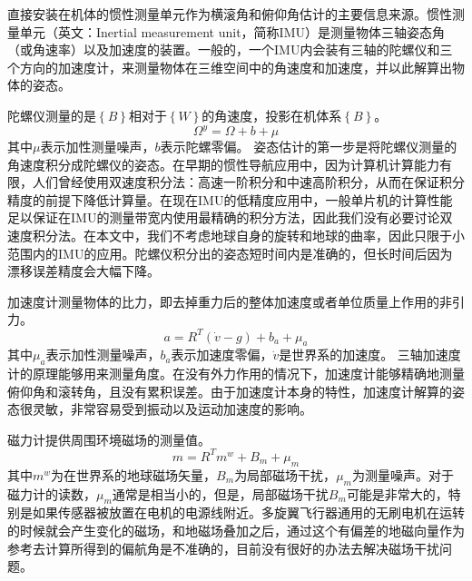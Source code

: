 \documentclass[
  type=master
]{gdutthesis}
\begin{document}
直接安装在机体的惯性测量单元作为横滚角和俯仰角估计的主要信息来源。惯性测量单元（英文：Inertial measurement unit，简称IMU）是测量物体三轴姿态角（或角速率）以及加速度的装置。一般的，一个IMU内会装有三轴的陀螺仪和三个方向的加速度计，来测量物体在三维空间中的角速度和加速度，并以此解算出物体的姿态。\par
陀螺仪测量的是$\left\{ B \right\}$相对于$\left\{ W \right\}$的角速度，投影在机体系$\left\{ B \right\}$。
\begin{equation}\label{eq:gyromodel}
	\Omega^y=\Omega+b+\mu
\end{equation}
其中$\mu$表示加性测量噪声，$b$表示陀螺零偏。
姿态估计的第一步是将陀螺仪测量的角速度积分成陀螺仪的姿态。在早期的惯性导航应用中，因为计算机计算能力有限，人们曾经使用双速度积分法：高速一阶积分和中速高阶积分，从而在保证积分精度的前提下降低计算量\cite{savage1998strapdown}。在现在IMU的低精度应用中，一般单片机的计算性能足以保证在IMU的测量带宽内使用最精确的积分方法，因此我们没有必要讨论双速度积分法。在本文中，我们不考虑地球自身的旋转和地球的曲率，因此只限于小范围内的IMU的应用。陀螺仪积分出的姿态短时间内是准确的，但长时间后因为漂移误差精度会大幅下降\cite{钱华明2010基于}。\par
加速度计测量物体的比力，即去掉重力后的整体加速度或者单位质量上作用的非引力。
\begin{equation}\label{eq:accmodel}
	a=R^T(\dot{v}-g)+b_a+\mu_a
\end{equation}
其中$\mu_a$表示加性测量噪声，$b_a$表示加速度零偏，$\dot{v}$是世界系的加速度。
三轴加速度计的原理能够用来测量角度。在没有外力作用的情况下，加速度计能够精确地测量俯仰角和滚转角，且没有累积误差。由于加速度计本身的特性，加速度计解算的姿态很灵敏，非常容易受到振动以及运动加速度的影响\cite{赵翔2012基于}。

磁力计提供周围环境磁场的测量值。
\begin{equation}\label{eq:magmodel}
	m=R^T m^w+B_m+\mu_m
\end{equation}
其中$m^w$为在世界系的地球磁场矢量，$B_m$为局部磁场干扰，$\mu_m$为测量噪声。对于磁力计的读数，$\mu_m$通常是相当小的，但是，局部磁场干扰$B_m$可能是非常大的，特别是如果传感器被放置在电机的电源线附近。多旋翼飞行器通用的无刷电机在运转的时候就会产生变化的磁场，和地磁场叠加之后，通过这个有偏差的地磁向量作为参考去计算所得到的偏航角是不准确的，目前没有很好的办法去解决磁场干扰问题\cite{梅玲玉2019基于}。\par
\end{document}
